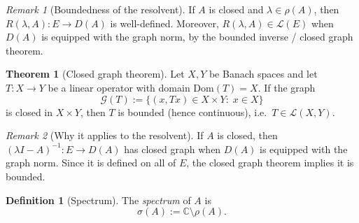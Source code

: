 \documentclass[11pt]{article}
\theoremstyle{definition}
\newtheorem{definition}{Definition}
\newtheorem{theorem}{Theorem}
\theoremstyle{remark}
\newtheorem{remark}{Remark}
\begin{document}
\begin{remark}[Boundedness of the resolvent]
If $A$ is closed and $\lambda\in\rho(A)$, then $R(\lambda,A)\colon E\to D(A)$ is well-defined.
Moreover, $R(\lambda,A)\in\mathcal{L}(E)$ when $D(A)$ is equipped with the graph norm, by the bounded inverse / closed graph theorem.
\end{remark}

\begin{theorem}[Closed graph theorem]
Let $X,Y$ be Banach spaces and let $T\colon X\to Y$ be a linear operator with domain $\mathrm{Dom}(T)=X$.
If the graph
\[
    \mathcal{G}(T):=\{(x,Tx)\in X\times Y:\;x\in X\}
\]
is closed in $X\times Y$, then $T$ is bounded (hence continuous), i.e.\ $T\in\mathcal{L}(X,Y)$.
\end{theorem}

\begin{remark}[Why it applies to the resolvent]
If $A$ is closed, then $(\lambda I-A)^{-1}\colon E\to D(A)$ has closed graph when $D(A)$ is equipped with the graph norm.
Since it is defined on all of $E$, the closed graph theorem implies it is bounded.
\end{remark}

\begin{definition}[Spectrum]
The \emph{spectrum} of $A$ is
\[
    \sigma(A) := \mathbb{C}\setminus \rho(A).
\]
\end{definition}
\end{document}
